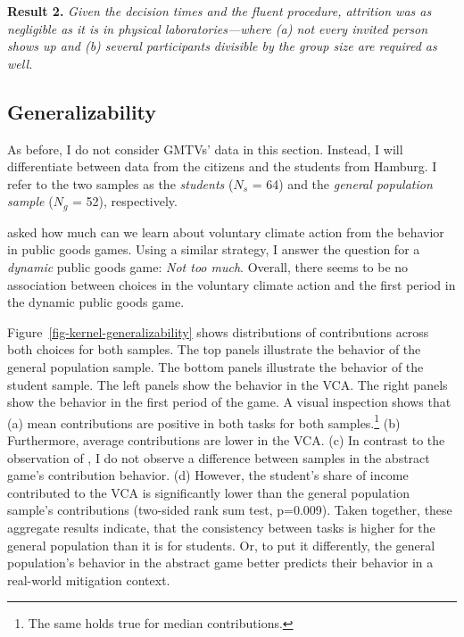 \documentclass[
  authoryear,
  review,
  3p,
  onecolumn]{elsarticle}
\begin{document}
\textbf{Result 2.} \emph{Given the decision times and the fluent
procedure, attrition was as negligible as it is in physical
laboratories---where (a) not every invited person shows up and (b)
several participants divisible by the group size are required as well.}

\hypertarget{sec-generalizability}{%
\subsection{Generalizability}\label{sec-generalizability}}

As before, I do not consider GMTVs' data in this section. Instead, I
will differentiate between data from the citizens and the students from
Hamburg. I refer to the two samples as the \emph{students} (\(N_s\) =
64) and the \emph{general population sample} (\(N_g\) = 52),
respectively.

\citet{GKLS2020} asked how much can we learn about voluntary climate
action from the behavior in public goods games. Using a similar
strategy, I answer the question for a \emph{dynamic} public goods game:
\emph{Not too much}. Overall, there seems to be no association between
choices in the voluntary climate action and the first period in the
dynamic public goods game.

Figure~\ref{fig-kernel-generalizability} shows distributions of
contributions across both choices for both samples. The top panels
illustrate the behavior of the general population sample. The bottom
panels illustrate the behavior of the student sample. The left panels
show the behavior in the VCA. The right panels show the behavior in the
first period of the game. A visual inspection shows that (a) mean
contributions are positive in both tasks for both samples.\footnote{The
  same holds true for median contributions.} (b) Furthermore, average
contributions are lower in the VCA. (c) In contrast to the observation
of \citet{GKLS2020}, I do not observe a difference between samples in
the abstract game's contribution behavior. (d) However, the student's
share of income contributed to the VCA is significantly lower than the
general population sample's contributions (two-sided rank sum test,
p=0.009). Taken together, these aggregate results indicate, that the
consistency between tasks is higher for the general population than it
is for students. Or, to put it differently, the general population's
behavior in the abstract game better predicts their behavior in a
real-world mitigation context.
\end{document}

